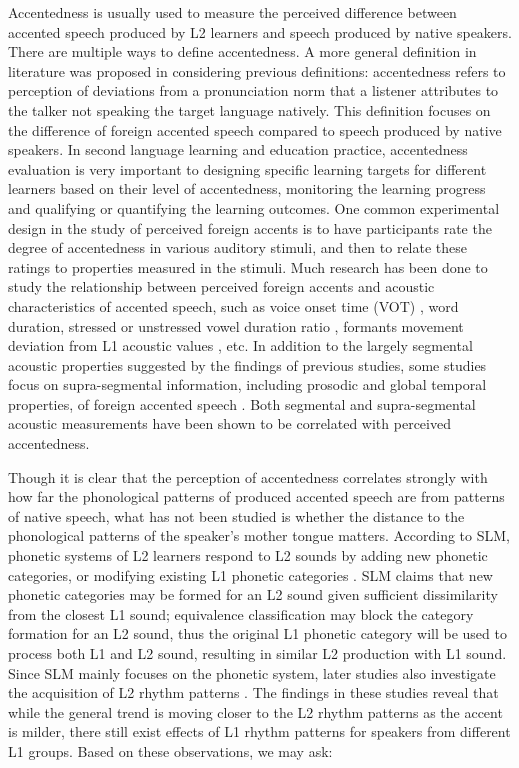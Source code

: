 Accentedness is usually used to measure the perceived difference between accented speech produced by L2 learners and speech produced by native speakers. There are multiple ways to define accentedness. A more general definition in literature was proposed in \citep{mccullough2013acoustic} considering previous definitions: accentedness refers to perception of deviations from a pronunciation norm that a listener attributes to the talker not speaking the target language natively. This definition focuses on the difference of foreign accented speech compared to speech produced by native speakers. In second language learning and education practice, accentedness evaluation is very important to designing specific learning targets for different learners based on their level of accentedness, monitoring the learning progress and qualifying or quantifying the learning outcomes. One common experimental design in the study of perceived foreign accents is to have participants rate the degree of accentedness in various auditory stimuli, and then to relate these ratings to properties measured in the stimuli. Much research has been done to study the relationship between perceived foreign accents and acoustic characteristics of accented speech, such as voice onset time (VOT) \citep{major1987english}, word duration, stressed or unstressed vowel duration ratio \citep{shah2002temporal}, formants movement deviation from L1 acoustic values \citep{munro1993productions}, etc. In addition to the largely segmental acoustic properties suggested by the findings of previous studies, some studies focus on supra-segmental information, including prosodic and global temporal properties, of foreign accented speech \citep{munro2010detection,kang2010relative}. Both segmental and supra-segmental acoustic measurements have been shown to be correlated with perceived accentedness.

Though it is clear that the perception of accentedness correlates strongly with how far the phonological patterns of produced accented speech are from patterns of native speech, what has not been studied is whether the distance to the phonological patterns of the speaker's mother tongue matters. According to SLM, phonetic systems of L2 learners respond to L2 sounds by adding new phonetic categories, or modifying existing L1 phonetic categories \citep{flege1995second}. SLM claims that new phonetic categories may be formed for an L2 sound given sufficient dissimilarity from the closest L1 sound; equivalence classification may block the category formation for an L2 sound, thus the original L1 phonetic category will be used to process both L1 and L2 sound, resulting in similar L2 production with L1 sound. Since SLM mainly focuses on the phonetic system, later studies also investigate the acquisition of L2 rhythm patterns \citep{rasier2007prosodic,ordin2015acquisition}. The findings in these studies reveal that while the general trend is moving closer to the L2 rhythm patterns as the accent is milder, there still exist effects of L1 rhythm patterns for speakers from different L1 groups. Based on these observations, we may ask:

